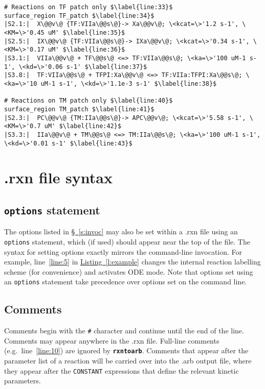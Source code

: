 \documentclass[fontsize=12pt,
               captions=abovetable,
               numbers=noenddot,
              ]{scrartcl}
\newcommand{\eg}[1][\ ]{e.g.#1}
\newcommand{\listing}[1]{\hyperref[l:#1]{Listing~\ref{l:#1}}}
\newcommand{\sect}[1]{\hyperref[s:#1]{\S~\ref{s:#1}}}
\newcommand{\rxntoarb}{\texttt{\textbf{rxntoarb}}}
\newcommand{\syntax}[2]{\textcolor{#1}{\texttt{#2}}}
\newcommand{\lnum}[1]{line~\ref{line:#1}}
\begin{document}
\begin{lstlisting}[float=p,caption={An example .rxn file (examples\slash{}thrombin\_generation\_JC\_model.rxn)},label={l:example}]
# Reactions on TF patch only $\label{line:33}$
surface_region TF_patch $\label{line:34}$
|S2.1:|  X\@@v\@ {TF:VIIa\@@s\@}-> Xa\@@v\@; \<kcat=\>'1.2 s-1', \<KM=\>'0.45 uM' $\label{line:35}$
|S2.5:|  IX\@@v\@ {TF:VIIa\@@s\@}-> IXa\@@v\@; \<kcat=\>'0.34 s-1', \<KM=\>'0.17 uM' $\label{line:36}$
|S3.1:|  VIIa\@@v\@ + TF\@@s\@ <=> TF:VIIa\@@s\@; \<ka=\>'100 uM-1 s-1', \<kd=\>'0.06 s-1' $\label{line:37}$
|S3.8:|  TF:VIIa\@@s\@ + TFPI:Xa\@@v\@ <=> TF:VIIa:TFPI:Xa\@@s\@; \<ka=\>'10 uM-1 s-1', \<kd=\>'1.1e-3 s-1' $\label{line:38}$

# Reactions on TM patch only $\label{line:40}$
surface_region TM_patch $\label{line:41}$
|S2.3:|  PC\@@v\@ {TM:IIa\@@s\@}-> APC\@@v\@; \<kcat=\>'5.58 s-1', \<KM=\>'0.7 uM' $\label{line:42}$
|S3.3:|  IIa\@@v\@ + TM\@@s\@ <=> TM:IIa\@@s\@; \<ka=\>'100 uM-1 s-1', \<kd=\>'0.01 s-1' $\label{line:43}$
\end{lstlisting}


\section{.rxn file syntax \label{s:rxn}}

\subsection{\syntax{statement}{options} statement \label{s:options}}

The options listed in \sect{invoc} may also be set within a .rxn file using an \syntax{statement}{options} statement, which (if used) should appear near the top of the file. The syntax for setting options exactly mirrors the command-line invocation. For example, \lnum{5} in \listing{example} changes the internal reaction labelling scheme (for convenience) and activates ODE mode. Note that options set using an \syntax{statement}{options} statement take precedence over options set on the command line.

\subsection{Comments}

Comments begin with the \syntax{comment}{\#} character and continue until the end of the line. Comments may appear anywhere in the .rxn file. Full-line comments (\eg \lnum{10}) are ignored by \rxntoarb{}. Comments that appear after the parameter list of a reaction will be carried over into the .arb output file, where they appear after the \texttt{CONSTANT} expressions that define the relevant kinetic parameters.
\end{document}
